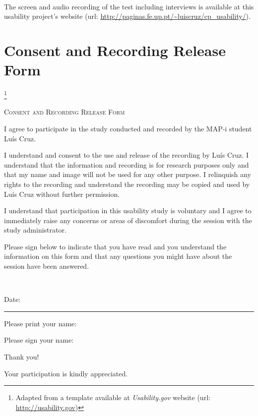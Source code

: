 \documentclass[a4paper]{article}
\begin{document}
\paragraph{} The screen and audio recording of the test including interviews is available at this usability project's website (url: \url{http://paginas.fe.up.pt/~luiscruz/cp_usability/}).


\appendix

\section{Consent and Recording Release Form}
 \footnote{Adapted from a template available at \textit{Usability.gov} website (url: \url{http://usability.gov})}
\begin{oframed}
  \begin{center}
    \large \textsc{Consent and Recording Release Form}
  \end{center} 
I agree to participate in the study conducted and recorded by the MAP-i student Luís Cruz. 

I understand and consent to the use and release of the recording by Luís Cruz. I understand that the information and recording is for research purposes only and that my name and image will not be used for any other purpose. I relinquish any rights to the recording and understand the recording may be copied and used by Luís Cruz without further permission. 

I understand that participation in this usability study is voluntary and I agree to immediately raise any concerns or areas of discomfort during the session with the study administrator.

Please sign below to indicate that you have read and you understand the information on this form and that any questions you might have about the session have been answered. 

~

Date: \rule{2cm}{0.4pt} 

Please print your name: \hrulefill

Please sign your name: \hrulefill



Thank you!

Your participation is kindly appreciated.
\end{oframed}


\end{document}
